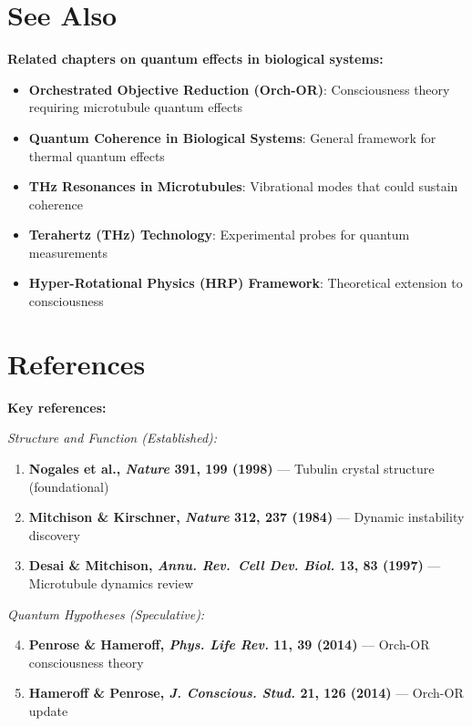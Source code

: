 \section{See Also}
\label{sec:see-also}

\textbf{Related chapters on quantum effects in biological systems:}
\begin{itemize}
\item \textbf{Orchestrated Objective Reduction (Orch-OR)}: Consciousness theory requiring microtubule quantum effects
\item \textbf{Quantum Coherence in Biological Systems}: General framework for thermal quantum effects
\item \textbf{THz Resonances in Microtubules}: Vibrational modes that could sustain coherence
\item \textbf{Terahertz (THz) Technology}: Experimental probes for quantum measurements
\item \textbf{Hyper-Rotational Physics (HRP) Framework}: Theoretical extension to consciousness
\end{itemize}

\section{References}
\label{sec:references}

\textbf{Key references:}

\textit{Structure and Function (Established):}
\begin{enumerate}
\item \textbf{Nogales et al., \emph{Nature} 391, 199 (1998)} --- Tubulin crystal structure (foundational)
\item \textbf{Mitchison \& Kirschner, \emph{Nature} 312, 237 (1984)} --- Dynamic instability discovery
\item \textbf{Desai \& Mitchison, \emph{Annu. Rev.~Cell Dev. Biol.} 13, 83 (1997)} --- Microtubule dynamics review
\end{enumerate}

\textit{Quantum Hypotheses (Speculative):}
\begin{enumerate}
\setcounter{enumi}{3}
\item \textbf{Penrose \& Hameroff, \emph{Phys. Life Rev.} 11, 39 (2014)} --- Orch-OR consciousness theory
\item \textbf{Hameroff \& Penrose, \emph{J. Conscious. Stud.} 21, 126 (2014)} --- Orch-OR update
\end{enumerate}

